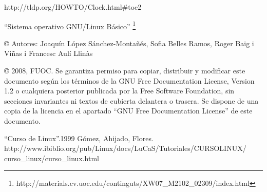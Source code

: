 \documentclass[12pt]{article}
\begin{document}
http://tldp.org/HOWTO/Clock.html\#toc2

``Sistema operativo GNU/Linux Básico'' \footnote{http://materials.cv.uoc.edu/continguts/XW07\_M2102\_02309/index.html}

© Autores: Joaquín López Sánchez-Montañés, Sofia Belles Ramos, Roger Baig i Viñas i Francesc Aulí Llinàs

© 2008, FUOC. Se garantiza permiso para copiar, distribuir y modificar este documento según los
términos de la GNU Free Documentation License, Version 1.2 o cualquiera posterior publicada por la
Free Software Foundation, sin secciones invariantes ni textos de cubierta delantera o trasera. Se dispone
de una copia de la licencia en el apartado ``GNU Free Documentation License'' de este documento.

\begin{thebibliography}{1}
 ``Curso de Linux''.1999 Gómez, Ahijado, Flores.\\ 
http://www.ibiblio.org/pub/Linux/docs/LuCaS/Tutoriales/CURSOLINUX/\\curso\_linux/curso\_linux.html
\end{thebibliography}
\end{document}
